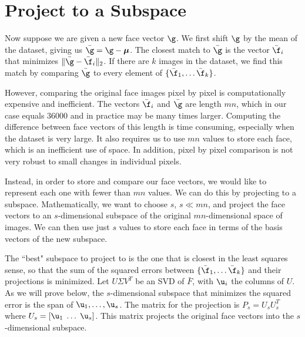 \section*{Project to a Subspace}
Now suppose we are given a new face vector $\g$. 
We first shift $\g$ by the mean of the dataset, giving us $\bar{\g} = \g - {\boldsymbol \mu}$.
The closest match to $\bar{\g}$ is the vector $\bar{\f}_i$ that minimizes $\|\bar{\g}-\bar{\f}_i\|_2$.
If there are $k$ images in the dataset, we find this match by comparing $\bar{\g}$ to every element of $\{\bar{\f}_1, \ldots \bar{\f}_k\}$.

However, comparing the original face images pixel by pixel is computationally expensive and inefficient.
The vectors $\bar{\f}_i$ and $\bar{\g}$ are length $mn$, which in our case equals 36000 and in practice may be many times larger.
Computing the difference between face vectors of this length is time consuming, especially when the dataset is very large.
It also requires us to use $mn$ values to store each face, which is an inefficient use of space.
In addition, pixel by pixel comparison is not very robust to small changes in individual pixels.

Instead, in order to store and compare our face vectors, we would like to represent each one with fewer than $mn$ values.
We can do this by projecting to a subspace.
Mathematically, we want to choose $s$, $s \ll mn$, and project the face vectors to an $s$-dimensional subspace of the original $mn$-dimensional space of images.
We can then use just $s$ values to store each face in terms of the basis vectors of the new subspace.

The ``best" subspace to project to is the one that is closest in the least squares sense, so that the sum of the squared errors between $\{\bar{\f}_1, \ldots \bar{\f}_k\}$ and their projections is minimized.
Let $U \Sigma V^T$ be an SVD of $\bar{F}$, with $\u_i$ the columns of $U$. 
As we will prove below, the $s$-dimensional subspace that minimizes the squared error is the span of $\u_1, \ldots, \u_s$.
The matrix for the projection is $P_s = U_s U_s^T$ where $U_s = [ \u_1\; \ldots \; \u_s]$. 
This matrix projects the original face vectors into the $s$-dimensional subspace. 

